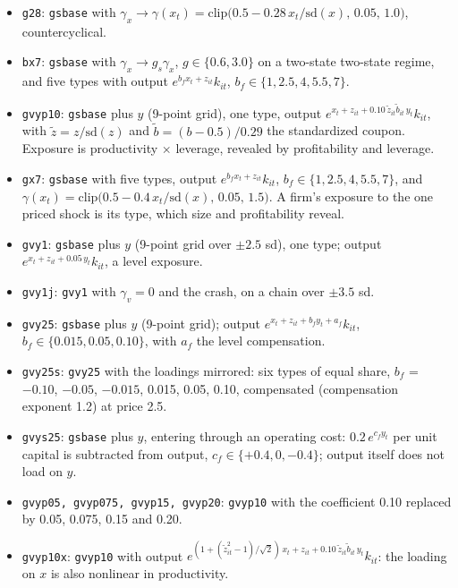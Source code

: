 \documentclass[11pt]{article}
\begin{document}
\begin{itemize}
\item \texttt{g28}: \texttt{gsbase} with $\gamma_x\to\gamma(x_t)=\mathrm{clip}\big(0.5-0.28\,x_t/\mathrm{sd}(x),\,0.05,\,1.0\big)$, countercyclical.
\item \texttt{bx7}: \texttt{gsbase} with $\gamma_x\to g_s\gamma_x$, $g\in\{0.6,3.0\}$ on a two-state two-state regime, and five types with output $e^{b_f x_t+z_{it}}k_{it}$, $b_f\in\{1,2.5,4,5.5,7\}$.
\item \texttt{gvyp10}: \texttt{gsbase} plus $y$ (9-point grid), one type, output $e^{x_t+z_{it}+0.10\,\tilde z_{it}\tilde b_{it}\,y_t}k_{it}$, with $\tilde z=z/\mathrm{sd}(z)$ and $\tilde b=(b-0.5)/0.29$ the standardized coupon. Exposure is productivity $\times$ leverage, revealed by profitability and leverage.
\item \texttt{gx7}: \texttt{gsbase} with five types, output $e^{b_f x_t+z_{it}}k_{it}$, $b_f\in\{1,2.5,4,5.5,7\}$, and $\gamma(x_t)=\mathrm{clip}\big(0.5-0.4\,x_t/\mathrm{sd}(x),\,0.05,\,1.5\big)$. A firm's exposure to the one priced shock is its type, which size and profitability reveal.
\item \texttt{gvy1}: \texttt{gsbase} plus $y$ (9-point grid over $\pm2.5$ sd), one type; output $e^{x_t+z_{it}+0.05\,y_t}k_{it}$, a level exposure.
\item \texttt{gvy1j}: \texttt{gvy1} with $\gamma_v=0$ and the crash, on a chain over $\pm3.5$ sd.
\item \texttt{gvy25}: \texttt{gsbase} plus $y$ (9-point grid); output $e^{x_t+z_{it}+b_f y_t+a_f}k_{it}$, $b_f\in\{0.015,0.05,0.10\}$, with $a_f$ the level compensation.
\item \texttt{gvy25s}: \texttt{gvy25} with the loadings mirrored: six types of equal share, $b_f$ = $-0.10$, $-0.05$, $-0.015$, 0.015, 0.05, 0.10, compensated (compensation exponent 1.2) at price 2.5.
\item \texttt{gvys25}: \texttt{gsbase} plus $y$, entering through an operating cost: $0.2\,e^{c_f y_t}$ per unit capital is subtracted from output, $c_f\in\{+0.4,0,-0.4\}$; output itself does not load on $y$.
\item \texttt{gvyp05, gvyp075, gvyp15, gvyp20}: \texttt{gvyp10} with the coefficient 0.10 replaced by 0.05, 0.075, 0.15 and 0.20.
\item \texttt{gvyp10x}: \texttt{gvyp10} with output $e^{(1+(\tilde z_{it}^2-1)/\sqrt2)\,x_t+z_{it}+0.10\,\tilde z_{it}\tilde b_{it}\,y_t}k_{it}$: the loading on $x$ is also nonlinear in productivity.

\end{itemize}
\end{document}
